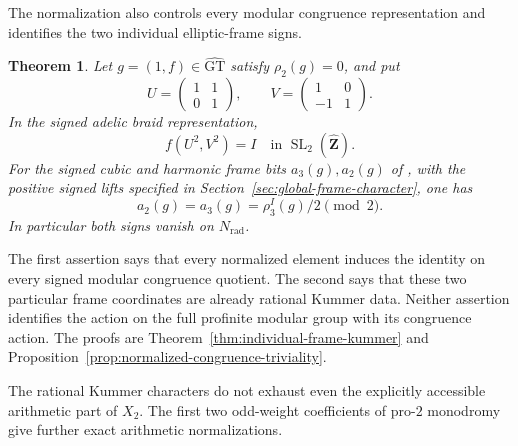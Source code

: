 \documentclass[11pt,a4paper]{article}
\newtheorem{theorem}{Theorem}[section]
\theoremstyle{definition}
\theoremstyle{remark}
\newcommand{\GT}{\widehat{\mathrm{GT}}}
\newcommand{\Zh}{\widehat{\mathbf Z}}
\begin{document}
The normalization also controls every modular congruence representation
and identifies the two individual elliptic-frame signs.

\begin{theorem}\label{thm:main-congruence-frames}
Let $g=(1,f)\in\GT$ satisfy $\rho_2(g)=0$, and put
\[
 U=\begin{pmatrix}1&1\\0&1\end{pmatrix},\qquad
 V=\begin{pmatrix}1&0\\-1&1\end{pmatrix}.
\]
In the signed adelic braid representation,
\[
 f(U^2,V^2)=I\quad\text{in }\operatorname{SL}_2(\Zh).
\]
For the signed cubic and harmonic frame bits $a_3(g),a_2(g)$
of \cite[Lemmas 12--15]{H17}, with the positive signed lifts
specified in Section~\ref{sec:global-frame-character}, one has
\[
 a_2(g)=a_3(g)=\rho_3^I(g)/2\pmod2.
\]
In particular both signs vanish on $N_{\mathrm{rad}}$.
\end{theorem}

The first assertion says that every normalized element induces the
identity on every signed modular congruence quotient. The second says
that these two particular frame coordinates are already rational
Kummer data. Neither assertion identifies the action on the full
profinite modular group with its congruence action. The proofs are
Theorem~\ref{thm:individual-frame-kummer} and
Proposition~\ref{prop:normalized-congruence-triviality}.

The rational Kummer characters do not exhaust even the explicitly
accessible arithmetic part of $X_2$.  The first two odd-weight coefficients of pro-$2$
monodromy give further exact arithmetic normalizations.
\end{document}
